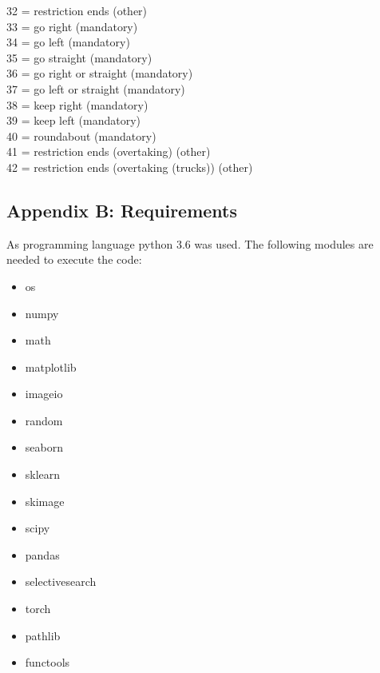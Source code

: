 \documentclass[12pt,a4paper,bibliography=totocnumbered,listof=totocnumbered]{scrartcl}
\begin{document}
32 = restriction ends (other)\\
33 = go right (mandatory)\\
34 = go left (mandatory)\\
35 = go straight (mandatory)\\
36 = go right or straight (mandatory)\\
37 = go left or straight (mandatory)\\
38 = keep right (mandatory)\\
39 = keep left (mandatory)\\
40 = roundabout (mandatory)\\
41 = restriction ends (overtaking) (other)\\
42 = restriction ends (overtaking (trucks)) (other)\\

\subsection{Appendix B: Requirements}
As programming language python 3.6 was used. The following modules are needed to execute the code:
\begin{itemize}
	\item os
	\item numpy
	\item math
	\item matplotlib
	\item imageio
	\item random
	\item seaborn
	\item sklearn
	\item skimage
	\item scipy
	\item pandas
	\item selectivesearch
	\item torch
	\item pathlib
	\item functools
\end{itemize}


\renewcommand\refname{References}


\pagebreak
\end{document}
